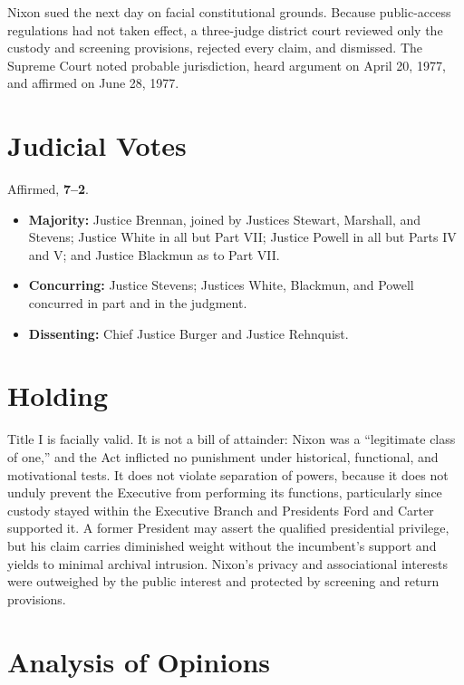 \documentclass[12pt]{article}
\begin{document}
Nixon sued the next day on facial constitutional grounds. Because public-access regulations had not taken effect, a three-judge district court reviewed only the custody and screening provisions, rejected every claim, and dismissed. The Supreme Court noted probable jurisdiction, heard argument on April 20, 1977, and affirmed on June 28, 1977.

\section{Judicial Votes}

Affirmed, \textbf{7--2}.
\begin{itemize}
\item \textbf{Majority:} Justice Brennan, joined by Justices Stewart, Marshall, and Stevens; Justice White in all but Part VII; Justice Powell in all but Parts IV and V; and Justice Blackmun as to Part VII.
\item \textbf{Concurring:} Justice Stevens; Justices White, Blackmun, and Powell concurred in part and in the judgment.
\item \textbf{Dissenting:} Chief Justice Burger and Justice Rehnquist.
\end{itemize}

\section{Holding}

Title I is facially valid. It is not a bill of attainder: Nixon was a ``legitimate class of one,'' and the Act inflicted no punishment under historical, functional, and motivational tests. It does not violate separation of powers, because it does not unduly prevent the Executive from performing its functions, particularly since custody stayed within the Executive Branch and Presidents Ford and Carter supported it. A former President may assert the qualified presidential privilege, but his claim carries diminished weight without the incumbent's support and yields to minimal archival intrusion. Nixon's privacy and associational interests were outweighed by the public interest and protected by screening and return provisions.

\section{Analysis of Opinions}
\end{document}
